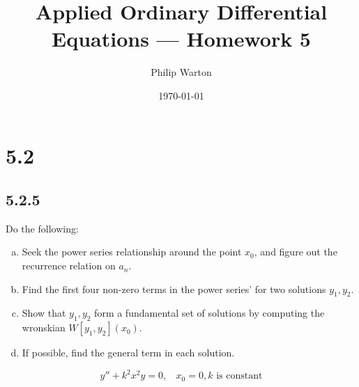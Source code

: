 \documentclass{article}
\theoremstyle{definition}
\begin{document}
\title{Applied Ordinary Differential Equations --- Homework 5}
\author{Philip Warton}
\date{\today}
\maketitle

\section*{5.2}
    \subsection*{5.2.5}
        \begin{mdframed}
            Do the following:
            \begin{enumerate}[a.]
                \item Seek the power series relationship around the point $x_0$,
                    and figure out the recurrence relation on $a_n$.
                \item Find the first four non-zero terms in the power series'
                    for two solutions $y_1, y_2$.
                \item Show that $y_1,y_2$ form a fundamental set of
                    solutions by computing the wronskian $W[y_1,y_2](x_0)$.
                \item If possible, find the general term in each solution.
            \end{enumerate}
            \[ 
                y'' + k^2 x^2 y = 0, \ \ \ \ x_0 = 0, k \text{ is constant}
            \]
        \end{mdframed}
\end{document}
